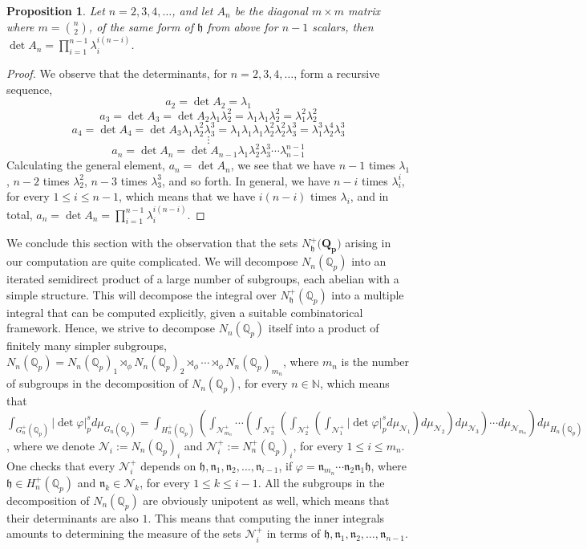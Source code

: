 \documentclass[12pt]{article}
\newtheorem{proposition}[theorem]{Proposition}
\begin{document}
\begin{proposition}
\label{prop.h.matrix.determinant}
Let $n=2,3,4,\dots$, and let $A_n$ 
be the diagonal $m\times m$ matrix where $m=\binom{n}{2}$, of the same form of $\mathfrak{h}$ from above for $n-1$ scalars, then $\det A_n=\prod_{i=1}^{n-1}\lambda_i^{i(n-i)}$.
\end{proposition}
\begin{proof}
We observe that the determinants, for $n=2,3,4,\dots$, form a recursive sequence,
$$a_2=\det A_2=\lambda_1$$
$$a_3=\det A_3=\det A_2\lambda_1\lambda_2^2=\lambda_1\lambda_1\lambda_2^2=\lambda_1^2\lambda_2^2$$
$$a_4=\det A_4=\det A_3\lambda_1\lambda_2^2\lambda_3^3=\lambda_1\lambda_1\lambda_1\lambda_2^2\lambda_2^2\lambda_3^3=\lambda_1^3\lambda_2^4\lambda_3^3$$
$$\vdots$$
$$a_n=\det A_n=\det A_{n-1}\lambda_1\lambda_2^2\lambda_3^3\cdots\lambda_{n-1}^{n-1}$$
Calculating the general element, $a_n=\det A_n$, we see that we have $n-1$ times $\lambda_1$, $n-2$ times $\lambda_2^2$, $n-3$ times $\lambda_3^3$, and so forth. In general, we have $n-i$ times $\lambda_i^i$, for every $1\leq i\leq n-1$, which means that we have $i(n-i)$ times $\lambda_i$, and in total, $a_n=\det A_n=\prod_{i=1}^{n-1}\lambda_i^{i(n-i)}$.
\end{proof}
We conclude this section with the observation that the sets $N_{\mathfrak{h}}^+(\mathbf{{Q}_p)}$ arising in our computation are quite complicated. We will decompose $N_n(\mathbb{Q}_p)$ into an iterated semidirect product of a large number of subgroups, each abelian with a simple structure. This will decompose the integral over $N_{\mathfrak{h}}^+(\mathbb{Q}_p)$ into a multiple integral that can be computed explicitly, given a suitable combinatorical framework. Hence, we strive to decompose $N_n(\mathbb{Q}_p)$ itself into a product of finitely many simpler subgroups, $N_n(\mathbb{Q}_p)= N_n(\mathbb{Q}_p)_1\rtimes_{\phi} N_n(\mathbb{Q}_p)_2\rtimes_{\phi}\cdots\rtimes_{\phi} N_n(\mathbb{Q}_p)_{m_n}$, where $m_n$ is the number of subgroups in the decomposition of $N_n(\mathbb{Q}_p)$, for every $n\in\mathbb{N}$, which means that $\displaystyle\int_{G_n^+(\mathbb{Q}_p)}|\det\varphi|_p^sd\mu_{G_n(\mathbb{Q}_p)}=\displaystyle\int_{H_n^+(\mathbb{Q}_p)}\left(\displaystyle\int_{\mathcal{N}^+_{m_n}}\cdots\left(\displaystyle\int_{\mathcal{N}^+_3}\left(\displaystyle\int_{\mathcal{N}^+_2}\left(\displaystyle\int_{\mathcal{N}^+_1}|\det\varphi|_p^sd\mu_{\mathcal{N}_1}\right)d\mu_{\mathcal{N}_2}\right)d\mu_{\mathcal{N}_3}\right)\cdots d\mu_{\mathcal{N}_{m_n}}\right)d\mu_{H_n(\mathbb{Q}_p)}$, where we denote $\mathcal{N}_i:=N_n(\mathbb{Q}_p)_i$ and $\mathcal{N}^+_i:=N_n^+(\mathbb{Q}_p)_i$, for every $1\leq i\leq m_n$. One checks that every $\mathcal{N}^+_i$ depends on $\mathfrak{h},\mathfrak{n}_1,\mathfrak{n}_2,\dots,\mathfrak{n}_{i-1}$, if $\varphi=\mathfrak{n}_{m_n}\cdots\mathfrak{n}_2\mathfrak{n}_1\mathfrak{h}$, where $\mathfrak{h}\in H_n^+(\mathbb{Q}_p)$ and $\mathfrak{n}_k\in\mathcal{N}_{k}$, for every $1\leq k\leq i-1$. 
All the subgroups in the decomposition of $N_n(\mathbb{Q}_p)$ are obviously unipotent as well, which means that their determinants are also $1$. This means that computing the inner integrals amounts to determining the measure of the sets $\mathcal{N}^+_i$ in terms of $\mathfrak{h},\mathfrak{n}_1,\mathfrak{n}_2,\dots,\mathfrak{n}_{n-1}$.
\end{document}
